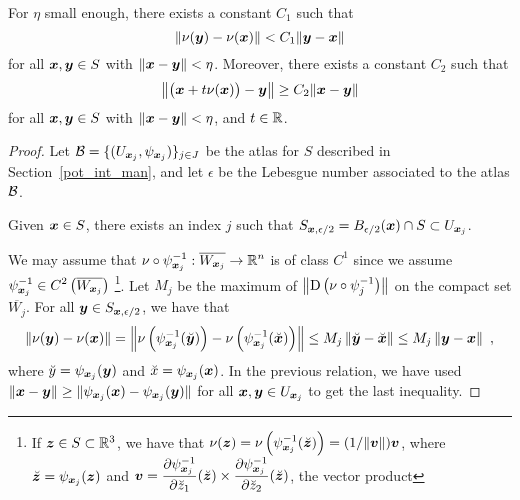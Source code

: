 \begin{lemma} \label{pot_inequ}
For $\eta$ small enough, there exists a constant $C_1$ such that
\[
\left\| \nu({\bm{y}}) - \nu({\bm{x}}) \right\| < C_1
\|{\bm{y}}-{\bm{x}}\|
\]
for all ${\bm{x}}, {\bm{y}} \in S$ with $\|{\bm{x}} - {\bm{y}}\|<\eta$.
Moreover, there exists a constant $C_2$ such that
\[
\left\| \big({\bm{x}} + t\nu({\bm{x}})\big) - {\bm{y}} \right\|
\geq C_2 \|{\bm{x}} - {\bm{y}}\|
\]
for all ${\bm{x}}, {\bm{y}} \in S$ with $\|{\bm{x}} - {\bm{y}}\|<\eta$,
and $t \in \mathbb{R}$.  
\end{lemma}

\begin{proof}
Let $\displaystyle \mathcal{B} = \{ (U_{{\bm{x}}_j}, \psi_{{\bm{x}}_j}) \}_{j\in J}$
be the atlas for $S$ described in Section~\ref{pot_int_man}, and
let $\epsilon$ be the Lebesgue number associated to the atlas $\mathcal{B}$.

Given ${\bm{x}} \in S$, there exists an index $j$ such that
$\displaystyle S_{{\bm{x}},\epsilon/2} = B_{\epsilon/2}({\bm{x}})
\cap S \subset U_{{\bm{x}}_j}$.

We may assume that
$\displaystyle \nu \circ \psi_{{\bm{x}}_j}^{-1}:
\overline{W_{{\bm{x}}_j}} \to \mathbb{R}^n$
is of class $\displaystyle C^1$ since we assume
$\displaystyle \psi_{{\bm{x}}_j}^{-1} \in
C^2\left(\overline{W_{{\bm{x}}_j}}\right)$
\footnote{If ${\bm{z}} \in S \subset \mathbb{R}^3$, we have that
$\displaystyle \nu({\bm{z}})
= \nu\left(\psi_{{\bm{x}}_j}^{-1}(\breve{{\bm{z}}})\right)
= (1/\|{\bm{v}}\|) {\bm{v}}$, where
$\breve{{\bm{z}}} = \psi_{{\bm{x}}_j}({\bm{z}})$ and
$\displaystyle {\bm{v}} = \frac{\partial{\psi_{{\bm{x}}_j}^{-1}}}{\partial \breve{z}_1}(
\breve{{\bm{z}}})
\times \frac{\partial{\psi_{{\bm{x}}_j}^{-1}}}{\partial \breve{z}_2}(\breve{{\bm{z}}})$,
the vector product}.
Let $M_j$ be the maximum of
$\displaystyle \left\| \operatorname{D} \left(\nu \circ \psi_j^{-1}\right)\right\|$
on the compact set $\displaystyle \overline{W_j}$.  For all
${\bm{y}} \in S_{{\bm{x}},\epsilon/2}$, we have that
\[
  \left\| \nu({\bm{y}}) - \nu({\bm{x}}) \right\|
= \left\| \nu\left(\psi_{{\bm{x}}_j}^{-1}(\breve{{\bm{y}}})\right) -
 \nu\left(\psi_{{\bm{x}}_j}^{-1}(\breve{{\bm{x}}})\right) \right\|
\leq M_j \left\| \breve{{\bm{y}}} - \breve{{\bm{x}}} \right\|
\leq M_j \left\| {\bm{y}} - {\bm{x}} \right\| \ ,
\]
where $\breve{y} = \psi_{{\bm{x}}_j}({\bm{y}})$ and
$\breve{x} = \psi_{{\bm{x}}_j}({\bm{x}})$.  In the previous relation, we
have used $\displaystyle \|{\bm{x}}-{\bm{y}}\| 
\geq \|\psi_{{\bm{x}}_j}({\bm{x}}) - \psi_{{\bm{x}}_j}({\bm{y}})\|$ for all
$\displaystyle {\bm{x}},{\bm{y}} \in U_{{\bm{x}}_j}$ to get the last
inequality.


\end{proof}
